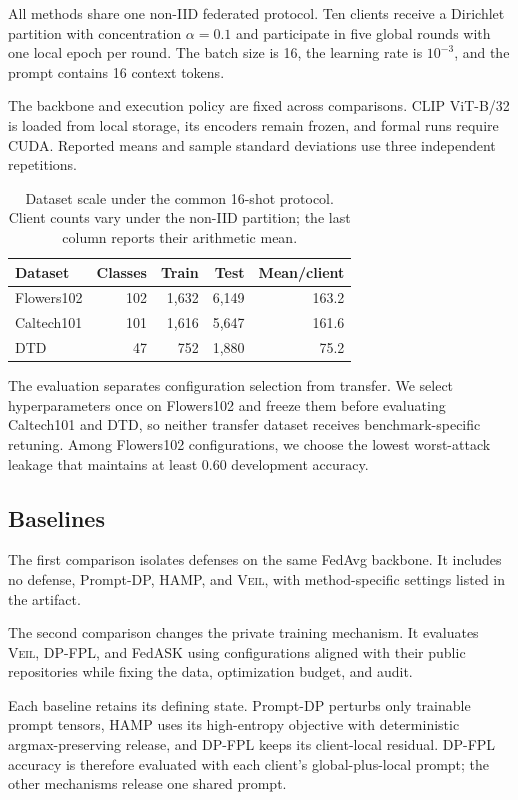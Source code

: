 \documentclass[letterpaper]{article}
\newcommand{\method}{\textsc{Veil}}
\begin{document}
All methods share one non-IID federated protocol.  Ten clients receive a
Dirichlet partition with concentration $\alpha=0.1$ and participate in five
global rounds with one local epoch per round.  The batch size is 16, the learning
rate is $10^{-3}$, and the prompt contains 16 context tokens.

The backbone and execution policy are fixed across comparisons.  CLIP ViT-B/32
is loaded from local storage, its encoders remain frozen, and formal runs require
CUDA.  Reported means and sample standard deviations use three independent
repetitions.

\begin{table}[t]
\centering
\begin{tabular}{lrrrr}
\toprule
Dataset & Classes & Train & Test & Mean/client\\
\midrule
Flowers102 & 102 & 1,632 & 6,149 & 163.2\\
Caltech101 & 101 & 1,616 & 5,647 & 161.6\\
DTD & 47 & 752 & 1,880 & 75.2\\
\bottomrule
\end{tabular}
\caption{Dataset scale under the common 16-shot protocol.  Client counts vary
under the non-IID partition; the last column reports their arithmetic mean.}
\label{tab:datasets}
\end{table}

The evaluation separates configuration selection from transfer.  We select
hyperparameters once on Flowers102 and freeze them before evaluating
Caltech101 and DTD, so neither transfer dataset receives benchmark-specific
retuning.  Among Flowers102 configurations, we choose the lowest worst-attack
leakage that maintains at least 0.60 development accuracy.

\subsection{Baselines}

The first comparison isolates defenses on the same FedAvg backbone.  It includes
no defense, Prompt-DP, HAMP, and \method{}, with method-specific settings listed
in the artifact.

The second comparison changes the private training mechanism.  It evaluates
\method{}, DP-FPL, and FedASK using
configurations aligned with their public repositories while fixing the data,
optimization budget, and audit.

Each baseline retains its defining state.  Prompt-DP perturbs only trainable
prompt tensors, HAMP uses its high-entropy objective with deterministic
argmax-preserving release, and DP-FPL keeps its client-local residual.  DP-FPL
accuracy is therefore evaluated with each client's global-plus-local prompt;
the other mechanisms release one shared prompt.
\end{document}
